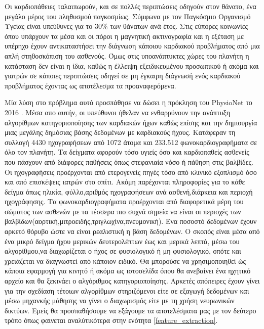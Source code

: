 \documentclass[../main.tex]{subfiles}
\begin{document}
Οι καρδιοπάθειες ταλαιπωρούν, και σε πολλές περιπτώσεις οδηγούν στον θάνατο, ένα
μεγάλο μέρος του πληθυσμού παγκοσμίως. Σύμφωνα με τον Παγκόσμιο Οργανισμό
Υγείας\cite{who} είναι υπεύθυνες για το 30\% των θάνατων ανά έτος. Στις εύπορες
κοινωνίες όπου υπάρχουν τα μέσα και οι πόροι η μαγνητική ακτινογραφία και η
εξέταση με υπέρηχο έχουν αντικαταστήσει την διάγνωση κάποιου καρδιακού
προβλήματος από μια απλή στηθοσκόπιση του ασθενούς. Όμως στις υποανάπτυκτες
χώρες του πλανήτη η κατάσταση δεν είναι η ίδια, καθώς η έλλειψη εξειδικευμένου
προσωπικού ή ακόμα και γιατρών σε κάποιες περιπτώσεις οδηγεί σε μη έγκαιρη
διάγνωσή ενός καρδιακού προβλήματος έχοντας ως αποτέλεσμα τα προαναφερόμενα.

Μία λύση στο πρόβλημα αυτό προσπάθησε να δώσει η πρόκληση του PhysioNet το 2016
\cite{clifford2016classification}. Μέσα απο αυτήν, οι υπεύθυνοι ήθελαν να
ενθαρρύνουν την ανάπτυξη αλγορίθμων κατηγοριοποίησης των καρδιακών ήχων καθώς
επίσης και την δημιουργία μιας μεγάλης δημόσιας βάσης δεδομένων με καρδιακούς
ήχους. Κατάφεραν τη συλλογή 4430 ηχογραφήσεων από 1072 άτομα και 233.512
φωνοκαρδιογραφήματα σε όλο τον πλανήτη.  Τα δείγματα αφορούν τόσο υγιείς όσο και
καρδιοπαθείς ασθενείς που πάσχουν από διάφορες παθήσεις όπως στεφανιαία νόσο ή
πάθηση στις βαλβίδες. Οι ηχογραφήσεις προέρχονται από ετερογενείς πηγές τόσο από
κλινικό εξοπλισμό όσο και από επισκέψεις ιατρών στο σπίτι. Ακόμη παρέχονται
πληροφορίες για το κάθε δείγμα όπως ηλικία, φύλλο,αριθμός ηχογραφήσεων ανά
ασθενή,διάρκεια και περιοχή ηχογράφησης. Τα φωνοκαρδιογραφήματα προέρχονται από
διαφορετικά μέρη του σώματος των ασθενών με τα τέσσερα πιο συχνά σημεία να είναι
οι περιοχές των βαλβίδων(αορτική,μιτροειδής,τριγλωχίνα,πνευμονική). Ένα ποσοστό
δεδομένων έχουν αρκετό θόρυβο ώστε να είναι ρεαλιστική η βάση δεδομένων.  Ο
σκοπός είναι μέσα από ένα μικρό δείγμα ήχου μερικών δευτερολέπτων έως και μερικά
λεπτά, μέσω του αλγορίθμου,να διαχωρίζεται ο ήχος σε φυσιολογικό ή μη
φυσιολογικό, οπότε και χρειάζεται να διαγνωστεί από κάποιον ειδικό. Θα μπορούσε
να χρησιμοποιηθεί ώς κάποια εφαρμογή για κινητό ή ακόμα ως ιστοσελίδα όπου θα
ανεβαίνει ένα ηχητικό αρχείο και θα ξεκινάει ο αλγόριθμος κατηγοριοποίησης.
Αρκετές απόπειρες έχουν γίνει για την σχεδίαση τέτοιων αλγορίθμων στηριζόμενοι
είτε σε εξαγωγή δεδομένων και μέσω μηχανκής μάθησης να γίνει ο διαχωρισμός είτε
με τη χρήση νευρωνικών δικτύων. Εμείς θα προσπαθήσουμε να εξάγουμε τα
αποτελέσματα μας με τον δεύτερο τρόπο όπως φαινεται αναλύτικότερα στην ενότητα
\ref{feature_extraction}.
\end{document}
